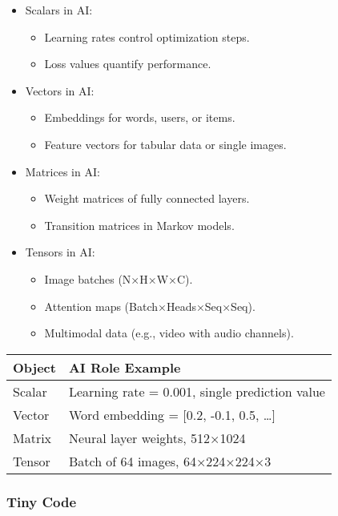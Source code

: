 \documentclass[
  letterpaper,
  DIV=11,
  numbers=noendperiod]{scrreprt}
\providecommand{\tightlist}{%
  \setlength{\itemsep}{0pt}\setlength{\parskip}{0pt}}
\begin{document}
\begin{itemize}
\item
  Scalars in AI:

  \begin{itemize}
  \tightlist
  \item
    Learning rates control optimization steps.
  \item
    Loss values quantify performance.
  \end{itemize}
\item
  Vectors in AI:

  \begin{itemize}
  \tightlist
  \item
    Embeddings for words, users, or items.
  \item
    Feature vectors for tabular data or single images.
  \end{itemize}
\item
  Matrices in AI:

  \begin{itemize}
  \tightlist
  \item
    Weight matrices of fully connected layers.
  \item
    Transition matrices in Markov models.
  \end{itemize}
\item
  Tensors in AI:

  \begin{itemize}
  \tightlist
  \item
    Image batches (N×H×W×C).
  \item
    Attention maps (Batch×Heads×Seq×Seq).
  \item
    Multimodal data (e.g., video with audio channels).
  \end{itemize}
\end{itemize}

\begin{longtable}[]{@{}ll@{}}
\toprule\noalign{}
Object & AI Role Example \\
\midrule\noalign{}
\endhead
\bottomrule\noalign{}
\endlastfoot
Scalar & Learning rate = 0.001, single prediction value \\
Vector & Word embedding = {[}0.2, -0.1, 0.5, \ldots{]} \\
Matrix & Neural layer weights, 512×1024 \\
Tensor & Batch of 64 images, 64×224×224×3 \\
\end{longtable}

\subsubsection{Tiny Code}\label{tiny-code-109}
\end{document}
